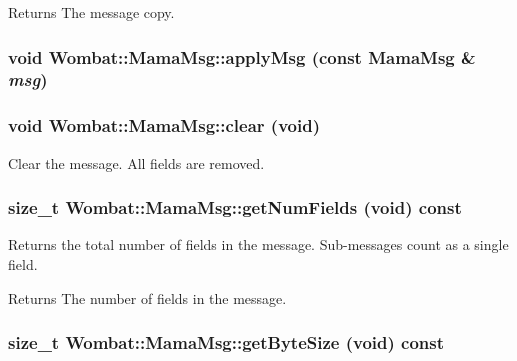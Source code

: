 \begin{DoxyReturn}{Returns}
The message copy. 
\end{DoxyReturn}
\hypertarget{classWombat_1_1MamaMsg_ab2d67b34c26777a8d1442889834996b6}{
\subsubsection[{applyMsg}]{\setlength{\rightskip}{0pt plus 5cm}void Wombat::MamaMsg::applyMsg (const {\bf MamaMsg} \& {\em msg})}}
\label{classWombat_1_1MamaMsg_ab2d67b34c26777a8d1442889834996b6}
\hypertarget{classWombat_1_1MamaMsg_a25d3af98bfa9ad89d93d6534a2c0ae2d}{
\subsubsection[{clear}]{\setlength{\rightskip}{0pt plus 5cm}void Wombat::MamaMsg::clear (void)}}
\label{classWombat_1_1MamaMsg_a25d3af98bfa9ad89d93d6534a2c0ae2d}


Clear the message. All fields are removed. \hypertarget{classWombat_1_1MamaMsg_a51d42ee46ebdc5d6acaec8b88461985f}{
\subsubsection[{getNumFields}]{\setlength{\rightskip}{0pt plus 5cm}size\_\-t Wombat::MamaMsg::getNumFields (void) const}}
\label{classWombat_1_1MamaMsg_a51d42ee46ebdc5d6acaec8b88461985f}


Returns the total number of fields in the message. Sub-\/messages count as a single field.

\begin{DoxyReturn}{Returns}
The number of fields in the message. 
\end{DoxyReturn}
\hypertarget{classWombat_1_1MamaMsg_ad6484dcc3225bedd025142b9f8c821c0}{
\subsubsection[{getByteSize}]{\setlength{\rightskip}{0pt plus 5cm}size\_\-t Wombat::MamaMsg::getByteSize (void) const}}
\label{classWombat_1_1MamaMsg_ad6484dcc3225bedd025142b9f8c821c0}


